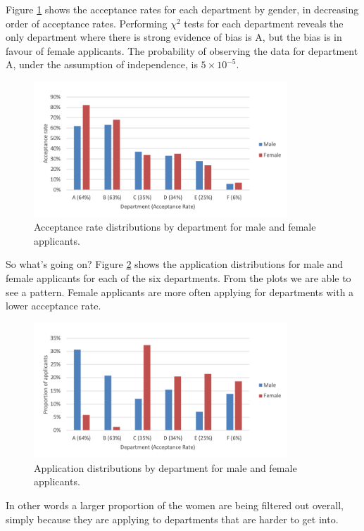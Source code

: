 Figure \ref{fig_SimpsParAccByDept} shows the acceptance rates for each department by gender, in decreasing order of acceptance rates. Performing $\chi^2$ tests for each department reveals the only department where there is strong evidence of bias is A, but the bias is in favour of female applicants. The probability of observing the data for department A, under the assumption of independence, is $5\times10^{-5}$.
%
\begin{figure}[h!]
\centering
\includegraphics[width=0.85\textwidth]{01_MotivationAndContext/figures/Fig_BerkeleyAccByDept.png}
\caption{Acceptance rate distributions by department for male and female applicants.}
\label{fig_SimpsParAccByDept}
\end{figure}
%
So what's going on? Figure \ref{fig_SimpsParAppByDept} shows the application distributions for male and female applicants for each of the six departments. From the plots we are able to see a pattern. Female applicants are more often applying for departments with a lower acceptance rate.
%
\begin{figure}[h!]
\centering
\includegraphics[width=0.85\textwidth]{01_MotivationAndContext/figures/Fig_BerkeleyAppByDept.png}
\caption{Application distributions by department for male and female applicants.}
\label{fig_SimpsParAppByDept}
\end{figure}
%
In other words a larger proportion of the women are being filtered out overall, simply because they are applying to departments that are harder to get into.

